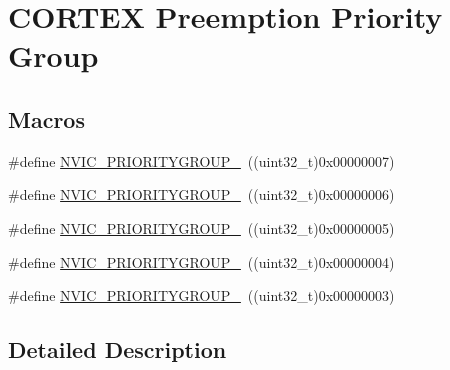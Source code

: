 \hypertarget{group___c_o_r_t_e_x___preemption___priority___group}{\section{C\-O\-R\-T\-E\-X Preemption Priority Group}
\label{group___c_o_r_t_e_x___preemption___priority___group}
}
\subsection*{Macros}
\begin{DoxyCompactItemize}
\item 
\#define \hyperlink{group___c_o_r_t_e_x___preemption___priority___group_ga5e97dcff77680602c86e44f23f5ffa1a}{N\-V\-I\-C\-\_\-\-P\-R\-I\-O\-R\-I\-T\-Y\-G\-R\-O\-U\-P\-\_}~((uint32\-\_\-t)0x00000007)
\item 
\#define \hyperlink{group___c_o_r_t_e_x___preemption___priority___group_ga702227137b010421c3a3b6434005a132}{N\-V\-I\-C\-\_\-\-P\-R\-I\-O\-R\-I\-T\-Y\-G\-R\-O\-U\-P\-\_}~((uint32\-\_\-t)0x00000006)
\item 
\#define \hyperlink{group___c_o_r_t_e_x___preemption___priority___group_gaa43a3fd37850c120ce567ab2743d11b4}{N\-V\-I\-C\-\_\-\-P\-R\-I\-O\-R\-I\-T\-Y\-G\-R\-O\-U\-P\-\_}~((uint32\-\_\-t)0x00000005)
\item 
\#define \hyperlink{group___c_o_r_t_e_x___preemption___priority___group_ga8ddb24962e6f0fc3273139d45d374b09}{N\-V\-I\-C\-\_\-\-P\-R\-I\-O\-R\-I\-T\-Y\-G\-R\-O\-U\-P\-\_}~((uint32\-\_\-t)0x00000004)
\item 
\#define \hyperlink{group___c_o_r_t_e_x___preemption___priority___group_gae6eab9140204bc938255aa148e597c45}{N\-V\-I\-C\-\_\-\-P\-R\-I\-O\-R\-I\-T\-Y\-G\-R\-O\-U\-P\-\_}~((uint32\-\_\-t)0x00000003)
\end{DoxyCompactItemize}


\subsection{Detailed Description}


